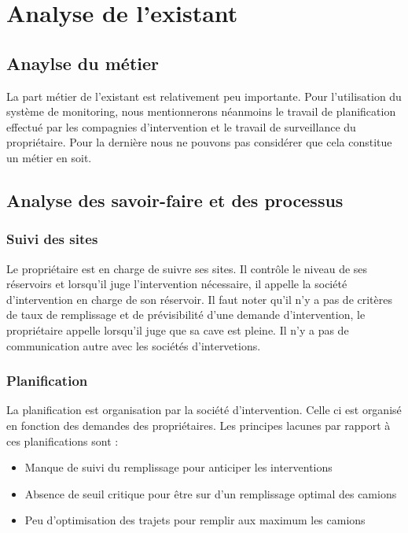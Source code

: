 \section{Analyse de l'existant}

\subsection{Anaylse du métier}

La part métier de l'existant est relativement peu importante. Pour l'utilisation du système de monitoring, nous mentionnerons néanmoins le travail de planification effectué par les compagnies d'intervention et le travail de surveillance du propriétaire. Pour la dernière nous ne pouvons pas considérer que cela constitue un métier en soit.

\subsection{Analyse des savoir-faire et des processus}

\subsubsection{Suivi des sites}

Le propriétaire est en charge de suivre ses sites. Il contrôle le niveau de ses réservoirs et lorsqu'il juge l'intervention nécessaire, il appelle la société d'intervention en charge de son réservoir. Il faut noter qu'il n'y a pas de critères de taux de remplissage et de prévisibilité d'une demande d'intervention, le propriétaire appelle lorsqu'il juge que sa cave est pleine.
Il n'y a pas de communication autre avec les sociétés d'intervetions.


\subsubsection{Planification}

La planification est organisation par la société d'intervention. Celle ci est organisé en fonction des demandes des propriétaires. Les principes lacunes par rapport à ces planifications sont : 
\begin{itemize}
\item Manque de suivi du remplissage pour anticiper les interventions
\item Absence de seuil critique pour être sur d'un remplissage optimal des camions
\item Peu d'optimisation des trajets pour remplir aux maximum les camions
\end{itemize}

